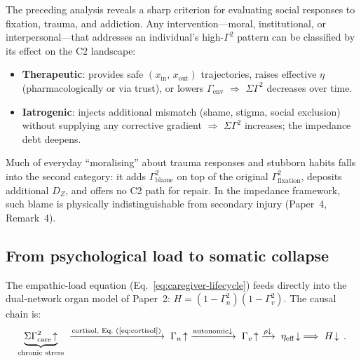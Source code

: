 \documentclass[aps,pre,twocolumn,superscriptaddress,floatfix]{revtex4-2}
\begin{document}
\begin{remark}
\label{rem:moral-load}
The preceding analysis reveals a sharp criterion for
evaluating social responses to fixation, trauma, and
addiction.
Any intervention---moral, institutional, or
interpersonal---that addresses an individual's
high-$\Gamma^2$ pattern can be classified by its
effect on the C2 landscape:
\begin{itemize}
  \item \textbf{Therapeutic}:
    provides safe $(x_{\text{in}},\,x_{\text{out}})$
    trajectories, raises effective $\eta$
    (pharmacologically or via trust), or lowers
    $\Gamma_{\text{env}}$ \;$\Rightarrow$\;
    $\Sigma\Gamma^2$ decreases over time.
  \item \textbf{Iatrogenic}:
    injects additional mismatch (shame, stigma,
    social exclusion) without supplying any
    corrective gradient
    \;$\Rightarrow$\;
    $\Sigma\Gamma^2$ increases;
    the impedance debt deepens.
\end{itemize}
Much of everyday ``moralising'' about trauma responses
and stubborn habits falls into the second category:
it adds $\Gamma_{\text{blame}}^2$ on top of the
original $\Gamma_{\text{fixation}}^2$, deposits
additional $D_Z$, and offers no C2 path for repair.
In the impedance framework, such blame is
physically indistinguishable from secondary injury
(Paper~4, Remark~4).
\end{remark}


\subsection{From psychological load to somatic collapse}
\label{sec:somatic-cascade}

The empathic-load equation
(Eq.~\ref{eq:caregiver-lifecycle}) feeds directly into
the dual-network organ model of
Paper~2: $H = (1-\Gamma_n^2)(1-\Gamma_v^2)$.
The causal chain is:
\begin{equation}
  \underbrace{\Sigma\Gamma^2_{\text{care}}\!\uparrow
    }_{\text{chronic stress}}
  \;\xrightarrow{\text{cortisol, Eq.~(\ref{eq:cortisol})}}
  \;\Gamma_n\!\uparrow
  \;\xrightarrow{\text{autonomic}\downarrow}
  \;\Gamma_v\!\uparrow
  \;\xrightarrow{\rho\downarrow}
  \;\eta_{\text{eff}}\!\downarrow
  \;\Longrightarrow
  \;H\!\downarrow\,.
  \label{eq:psych-somatic}
\end{equation}
\end{document}
